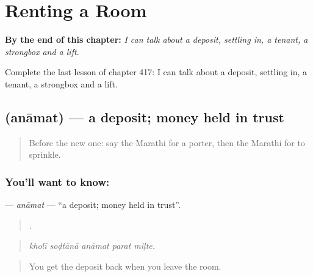 
\chapter{Renting a Room}
\label{ch:mr-renting-a-room}

\begin{chapteropening}
\textbf{By the end of this chapter:} \emph{I can talk about a deposit, settling in, a tenant, a strongbox and a lift.}

Complete the last lesson of chapter 417: I can talk about a deposit, settling in, a tenant, a strongbox and a lift.
\end{chapteropening}

\section[\texorpdfstring{\mr{अनामत} (anāmat)}{अनामत (anāmat)}]{ (anāmat) — a deposit; money held in trust}

\label{lesson:MR-C417-anamat}



\begin{quote}
Before the new one: say the Marathi for a porter, then the Marathi for to sprinkle.
\end{quote}

\subsection*{You'll want to know: }
\textbf{} — \emph{anāmat} — \textquotedblleft{}a deposit; money held in trust\textquotedblright{}.

\begin{quote}
    .
\end{quote}

\begin{quote}
\emph{kholī soḍtānā anāmat parat miḷte.}
\end{quote}

\begin{quote}
You get the deposit back when you leave the room.
\end{quote}

